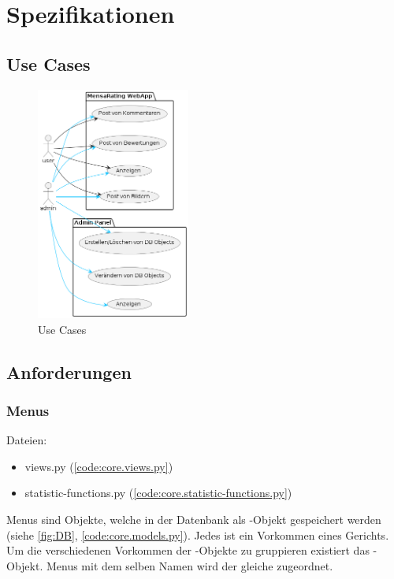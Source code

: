 \chapter{Spezifikationen}

\section{Use Cases} \label{sec:UseCases}
\begin{figure}[ht!]
    \centering
    \includegraphics[width=0.45\textwidth]{images/Use Case.png}
    \caption{Use Cases}
    \label{fig:UseCases}
\end{figure}

\newpage

\section{Anforderungen} \label{sec:Anforderungen}
\subsection{Menus} \label{spez:Menus}

Dateien:
\begin{itemize}
    \item views.py (\ref{code:core.views.py})
    \item statistic-functions.py (\ref{code:core.statistic-functions.py})
\end{itemize}

Menus sind Objekte, welche in der Datenbank als -Objekt gespeichert
werden (siehe \ref{fig:DB}, \ref{code:core.models.py}). Jedes  ist
ein Vorkommen eines Gerichts. Um die verschiedenen Vorkommen der
-Objekte zu gruppieren existiert das -Objekt.
Menus mit dem selben Namen wird der gleiche  zugeordnet. 

